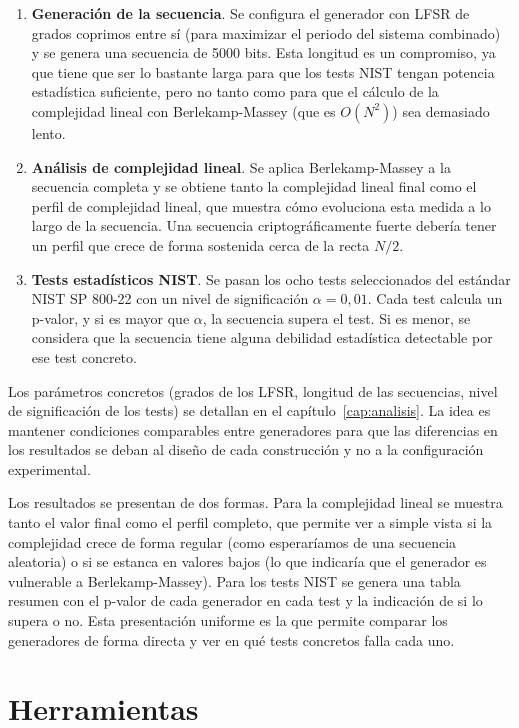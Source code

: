 \begin{enumerate}
  \item \textbf{Generación de la secuencia}. Se configura el generador con LFSR de grados coprimos entre sí
        (para maximizar el periodo del sistema combinado) y se genera una secuencia de 5000 bits.
        Esta longitud es un compromiso, ya que tiene que ser lo bastante larga
        para que los tests NIST tengan potencia estadística suficiente,
        pero no tanto como para que el cálculo de la complejidad lineal con Berlekamp-Massey (que es $O(N^2)$) sea demasiado lento.
  \item \textbf{Análisis de complejidad lineal}. Se aplica Berlekamp-Massey a la secuencia completa
        y se obtiene tanto la complejidad lineal final como el perfil de complejidad lineal,
        que muestra cómo evoluciona esta medida a lo largo de la secuencia.
        Una secuencia criptográficamente fuerte debería tener un perfil que crece de forma sostenida cerca de la recta $N/2$.
  \item \textbf{Tests estadísticos NIST}. Se pasan los ocho tests seleccionados del estándar NIST SP 800-22
        con un nivel de significación $\alpha = 0{,}01$. Cada test calcula un p-valor, y si es mayor que $\alpha$, la secuencia supera el test.
        Si es menor, se considera que la secuencia tiene alguna debilidad estadística detectable por ese test concreto.
\end{enumerate}

Los parámetros concretos (grados de los LFSR, longitud de las secuencias, nivel de significación de los tests)
se detallan en el capítulo~\ref{cap:analisis}.
La idea es mantener condiciones comparables entre generadores para que las diferencias en los resultados
se deban al diseño de cada construcción y no a la configuración experimental.

Los resultados se presentan de dos formas. Para la complejidad lineal se muestra tanto el valor final como el perfil completo,
que permite ver a simple vista si la complejidad crece de forma regular (como esperaríamos de una secuencia aleatoria)
o si se estanca en valores bajos (lo que indicaría que el generador es vulnerable a Berlekamp-Massey).
Para los tests NIST se genera una tabla resumen con el p-valor de cada generador en cada test
y la indicación de si lo supera o no. Esta presentación uniforme es la que permite comparar los generadores de forma directa
y ver en qué tests concretos falla cada uno.

\section{Herramientas}

